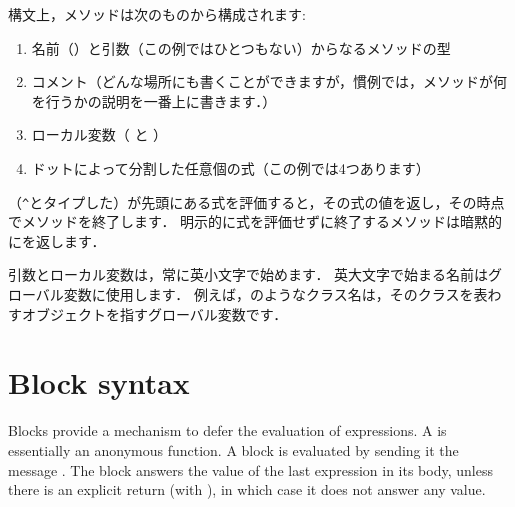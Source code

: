 \documentclass[a4paper,10pt,twoside]{book}
\begin{document}
構文上，メソッドは次のものから構成されます:
\begin{enumerate}
	\item 名前（\ie {}）と引数（この例ではひとつもない）からなるメソッドの型
	\item コメント（どんな場所にも書くことができますが，慣例では，メソッドが何を行うかの説明を一番上に書きます．）
	\item ローカル変数（\ie {} と ）
	\item ドットによって分割した任意個の式（この例では4つあります）
\end{enumerate}

\ct{^}（\verb|^|とタイプした）が先頭にある式を評価すると，その式の値を返し，その時点でメソッドを終了します．
明示的に式を評価せずに終了するメソッドは暗黙的にを返します．

引数とローカル変数は，常に英小文字で始めます．
英大文字で始まる名前はグローバル変数に使用します．
例えば，のようなクラス名は，そのクラスを表わすオブジェクトを指すグローバル変数です．


\section{Block syntax}

Blocks provide a mechanism to defer the evaluation of expressions.
A  is essentially an anonymous function. A block is evaluated by sending it the message .
The block answers the value of the last expression in its body, unless there is an explicit return (with \ct{^}), in which case it does not answer any value.
\end{document}
